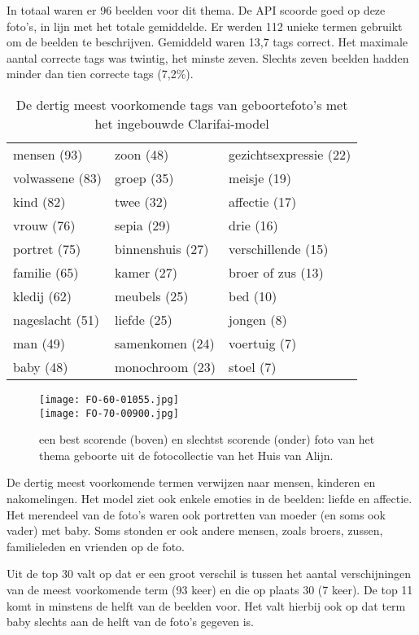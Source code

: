 In totaal waren er 96 beelden voor dit thema. De API scoorde goed op deze foto’s, in lijn met het totale gemiddelde. Er werden 112 unieke termen gebruikt om de beelden te beschrijven. Gemiddeld waren 13,7 tags correct. Het maximale aantal correcte tags was twintig, het minste zeven. Slechts zeven beelden hadden minder dan tien correcte tags (7,2\%).
\begin{table}
	\centering
	\begin{tabular}{*{3}{l}}
		mensen (93) & zoon (48) & gezichtsexpressie (22) \\
		volwassene (83) & 	groep (35) & meisje (19) \\
		kind (82) & twee (32) & affectie (17) \\
		vrouw (76) & sepia (29) & drie (16) \\
		portret (75) & binnenshuis (27) & verschillende (15) \\
		familie (65) & 	kamer (27) & broer of zus (13) \\
		kledij (62) & 	meubels (25) & bed (10) \\
		nageslacht (51) & liefde (25) & jongen (8) \\
		man (49) & samenkomen (24) & voertuig (7) \\
		baby (48) & monochroom (23) & stoel (7) \\	
	\end{tabular}
	\caption{De dertig meest voorkomende tags van geboortefoto's met het ingebouwde Clarifai-model}
	\label{tab:30-termen-geboorte}
\end{table}

\begin{figure}
	\centering
	\texttt{[image: FO-60-01055.jpg]}\hfill
    \\[\smallskipamount]
	\texttt{[image: FO-70-00900.jpg]}\hfill
	\caption[Best en slechtst scorende foto van thema geboorte]{een best scorende (boven) en slechtst scorende (onder) foto van het thema geboorte uit de fotocollectie van het Huis van Alijn.}
\end{figure}

De dertig meest voorkomende termen verwijzen naar mensen, kinderen en nakomelingen. Het model ziet ook enkele emoties in de beelden: liefde en affectie. Het merendeel van de foto’s waren ook portretten van moeder (en soms ook vader) met baby. Soms stonden er ook andere mensen, zoals broers, zussen, familieleden en vrienden op de foto. 

Uit de top 30 valt op dat er een groot verschil is tussen het aantal verschijningen van de meest voorkomende term (93 keer) en die op plaats 30 (7 keer). De top 11 komt in minstens de helft van de beelden voor. Het valt hierbij ook op dat term baby slechts aan de helft van de foto’s gegeven is.

